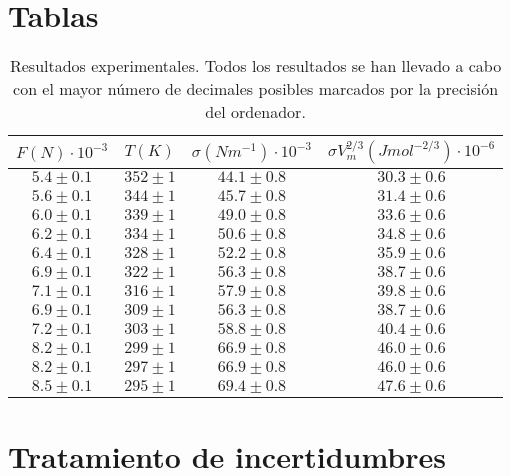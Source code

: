 \section{Tablas}

\begin{table}[h]
	\centering
		\begin{tabular}{cccc}
			\toprule
$F (N) \cdot 10^{-3}$   &   $T (K)$   &   $\sigma (Nm^{-1}) \cdot 10^{-3}$   &   $\sigma V_{m}^{2/3} (Jmol^{-2/3}) \cdot 10^{-6}$ \\
\midrule
$5.4 \pm 0.1$   &   $352 \pm 1$   &   $44.1 \pm 0.8$   &   $30.3 \pm 0.6$  \\
$5.6 \pm 0.1$   &   $344 \pm 1$   &   $45.7 \pm 0.8$   &   $31.4 \pm 0.6$  \\
$6.0 \pm 0.1$   &   $339 \pm 1$   &   $49.0 \pm 0.8$   &   $33.6 \pm 0.6$  \\
$6.2 \pm 0.1$   &   $334 \pm 1$   &   $50.6 \pm 0.8$   &   $34.8 \pm 0.6$  \\
$6.4 \pm 0.1$   &   $328 \pm 1$   &   $52.2 \pm 0.8$   &   $35.9 \pm 0.6$  \\
$6.9 \pm 0.1$   &   $322 \pm 1$   &   $56.3 \pm 0.8$   &   $38.7 \pm 0.6$  \\
$7.1 \pm 0.1$   &   $316 \pm 1$   &   $57.9 \pm 0.8$   &   $39.8 \pm 0.6$  \\
$6.9 \pm 0.1$   &   $309 \pm 1$   &   $56.3 \pm 0.8$   &   $38.7 \pm 0.6$  \\
$7.2 \pm 0.1$   &   $303 \pm 1$   &   $58.8 \pm 0.8$   &   $40.4 \pm 0.6$  \\
$8.2 \pm 0.1$   &   $299 \pm 1$   &   $66.9 \pm 0.8$   &   $46.0 \pm 0.6$  \\
$8.2 \pm 0.1$   &   $297 \pm 1$   &   $66.9 \pm 0.8$   &   $46.0 \pm 0.6$  \\
$8.5 \pm 0.1$   &   $295 \pm 1$   &   $69.4 \pm 0.8$   &   $47.6 \pm 0.6$  \\
			\bottomrule
		\end{tabular}
		\caption{Resultados experimentales. Todos los resultados se han llevado a cabo con el mayor número de decimales posibles marcados por la precisión del ordenador.}
		\label{table_exp}
\end{table}

\section{Tratamiento de incertidumbres}

